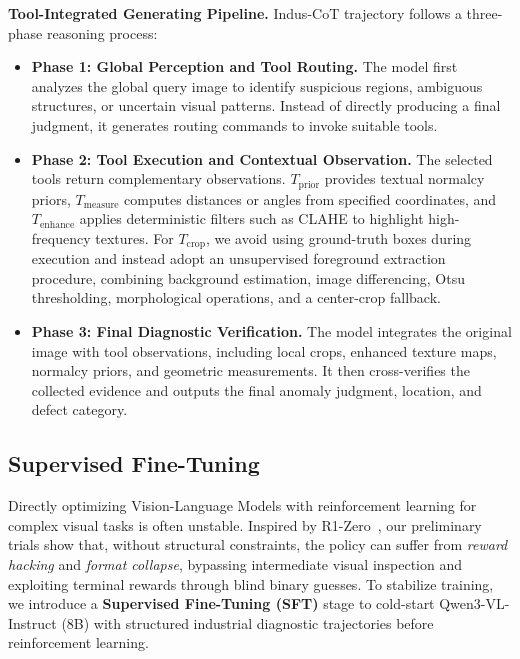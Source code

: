\documentclass{article}
\begin{document}
\textbf{Tool-Integrated Generating Pipeline.}
Indus-CoT trajectory follows a three-phase reasoning process:
\begin{itemize}[leftmargin=*,nosep]
    \item \textbf{Phase 1: Global Perception and Tool Routing.} 
    The model first analyzes the global query image to identify suspicious regions, ambiguous structures, or uncertain visual patterns. 
    Instead of directly producing a final judgment, it generates routing commands to invoke suitable tools.

    \item \textbf{Phase 2: Tool Execution and Contextual Observation.} 
    The selected tools return complementary observations. 
    $T_{\text{prior}}$ provides textual normalcy priors, $T_{\text{measure}}$ computes distances or angles from specified coordinates, and $T_{\text{enhance}}$ applies deterministic filters such as CLAHE to highlight high-frequency textures. 
    For $T_{\text{crop}}$, we avoid using ground-truth boxes during execution and instead adopt an unsupervised foreground extraction procedure, combining background estimation, image differencing, Otsu thresholding, morphological operations, and a center-crop fallback.

    \item \textbf{Phase 3: Final Diagnostic Verification.} 
    The model integrates the original image with tool observations, including local crops, enhanced texture maps, normalcy priors, and geometric measurements. 
    It then cross-verifies the collected evidence and outputs the final anomaly judgment, location, and defect category.
\end{itemize}

\subsection{Supervised Fine-Tuning}
\label{sec:SFT}

Directly optimizing Vision-Language Models with reinforcement learning for complex visual tasks is often unstable. Inspired by R1-Zero~\citep{guo2025deepseek}, our preliminary trials show that, without structural constraints, the policy can suffer from \emph{reward hacking} and \emph{format collapse}, bypassing intermediate visual inspection and exploiting terminal rewards through blind binary guesses. To stabilize training, we introduce a \textbf{Supervised Fine-Tuning (SFT)} stage to cold-start Qwen3-VL-Instruct (8B) with structured industrial diagnostic trajectories before reinforcement learning.
\end{document}
